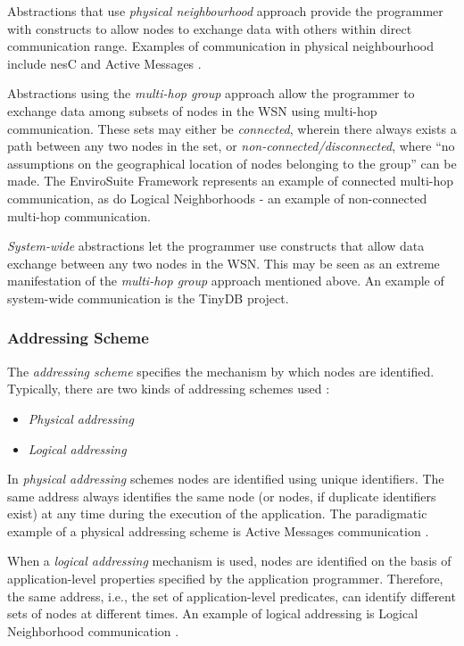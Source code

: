 Abstractions that use \emph{physical neighbourhood} approach provide
  the programmer with constructs to allow nodes to exchange data with others
  within direct communication range. Examples of communication in physical
  neighbourhood include nesC \cite{nesc:2003} and Active Messages \cite{activemessagesEicken:2001}.
  
Abstractions using the \emph{multi-hop group} approach allow the
  programmer to exchange data among subsets of nodes in the WSN using
  multi-hop communication. These sets may either be
  \emph{connected}, wherein there always exists a path between any two nodes in
  the set, or \emph{non-connected/disconnected}, where ``no assumptions on the geographical location of nodes 
belonging to the group'' \cite{mottola_middleware:2008} can be made.  
  The EnviroSuite Framework \cite{envirosuite:2006} represents an example of
  connected multi-hop communication, as do Logical Neighborhoods
  \cite{mottola_LN:2006} - an example of non-connected multi-hop
  communication.

\emph{System-wide} abstractions let the
  programmer use constructs that allow data exchange between any two nodes
  in the WSN. This may be seen as an extreme manifestation of the
  \emph{multi-hop group} approach mentioned above. An example of system-wide
  communication is the TinyDB \cite{madden_TinyDB:2005} project.
  
\subsubsection{Addressing Scheme}

The \emph{addressing scheme} specifies the mechanism by which nodes are
identified. Typically, there are two kinds of addressing schemes used
\cite{mottola_middleware:2008}:

\begin{itemize}
  \item \emph{Physical addressing}
  \item \emph{Logical addressing}
\end{itemize}

In \emph{physical addressing} schemes nodes are identified using unique 
  identifiers. The same address always identifies the same node (or nodes, if
  duplicate  identifiers exist) at any time during the execution of the
  application. The paradigmatic example of a physical addressing scheme is
  Active Messages communication \cite{activemessagesEicken:2001}.

When a \emph{logical addressing} mechanism is used, nodes are identified on the
basis of application-level properties specified by the application
programmer. Therefore, the same address, i.e., the set of
application-level predicates, can identify different sets of nodes at different
times. An example of logical addressing is Logical Neighborhood communication
\cite{mottola_LN:2006}.


